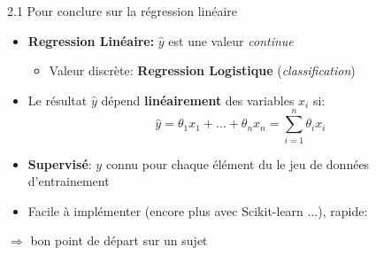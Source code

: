 \begin{frame}{2.1 Pour conclure sur la régression linéaire}
  \begin{itemize}
  \item \textbf{Regression Linéaire:} $\hat{y}$ est une valeur \textit{continue}
    \begin{itemize}
      \normalsize
    \item Valeur discrète: \textbf{Regression Logistique} (\textit{classification})
    \end{itemize}
    \vspace{0.2cm}
  \item Le résultat $\hat{y}$ dépend \textbf{linéairement} des variables $x_{i}$ si:
    \begin{equation*}
      \hat{y} = \theta_{1}x_{1} + \dots + \theta_{n}x_{n} = \displaystyle\sum_{i=1}^{n} \theta_{i} x_{i}
    \end{equation*}
  \item \textbf{Supervisé}: $y$ connu pour chaque élément du le jeu de données d'entrainement
  \item Facile à implémenter (encore plus avec Scikit-learn ...), rapide: 
  \end{itemize}
  \begin{center}
    $\Rightarrow$ bon point de départ sur un sujet
  \end{center}
\end{frame}

